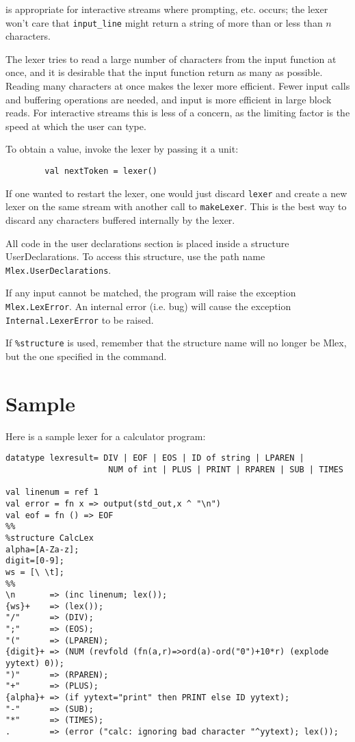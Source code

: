 is appropriate for interactive streams where prompting, etc.  occurs;
the lexer won't care that \verb|input_line| might return a string of more
than or less than $n$ characters.

The lexer tries to read a large number of characters from the input
function at once, and it is desirable that the input function return
as many as possible.  Reading many characters at once makes the lexer
more efficient.  Fewer input calls and buffering operations are
needed, and input is more efficient in large block reads.  For
interactive streams this is less of a concern, as the limiting factor
is the speed at which the user can type.

To obtain a value, invoke the lexer by passing it a unit:

\begin{verbatim}
        val nextToken = lexer()
\end{verbatim}

If one wanted to restart the lexer, one would just discard {\tt lexer}
and create a new lexer on the same stream with another call to
{\tt makeLexer}.  This is the best way to discard any characters buffered
internally by the lexer.

All code in the user declarations section is placed inside a
structure UserDeclarations.  To access this structure, use the path name
{\tt Mlex.UserDeclarations}.

If any input cannot be matched, the program will raise the exception
{\tt Mlex.LexError}.  An internal error (i.e.  bug) will cause the
exception {\tt Internal.LexerError} to be raised.

If {\tt \%structure} is used, remember that the structure name will no
longer be Mlex, but the one specified in the command.

\section{Sample}

Here is a sample lexer for a calculator program:

\small
\begin{verbatim}
datatype lexresult= DIV | EOF | EOS | ID of string | LPAREN |
                     NUM of int | PLUS | PRINT | RPAREN | SUB | TIMES 

val linenum = ref 1
val error = fn x => output(std_out,x ^ "\n")
val eof = fn () => EOF
%%
%structure CalcLex
alpha=[A-Za-z];
digit=[0-9];
ws = [\ \t];
%%
\n       => (inc linenum; lex());
{ws}+    => (lex());
"/"      => (DIV);
";"      => (EOS);
"("      => (LPAREN);
{digit}+ => (NUM (revfold (fn(a,r)=>ord(a)-ord("0")+10*r) (explode yytext) 0));
")"      => (RPAREN);
"+"      => (PLUS);
{alpha}+ => (if yytext="print" then PRINT else ID yytext);
"-"      => (SUB);
"*"      => (TIMES);
.        => (error ("calc: ignoring bad character "^yytext); lex());
\end{verbatim}


